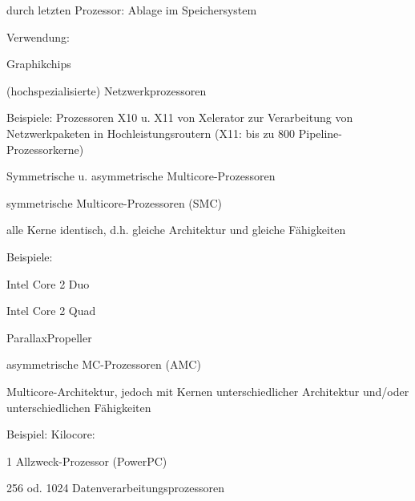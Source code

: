 \documentclass[a4paper]{article}
\begin{document}
\begin{multicols}{3}
\begin{itemize*}
\begin{itemize*}
            \item durch letzten Prozessor: Ablage im Speichersystem
            \item Verwendung: \begin{itemize*} \item   Graphikchips \item   (hochspezialisierte) Netzwerkprozessoren \end{itemize*}
            \item Beispiele: Prozessoren X10 u. X11 von Xelerator zur Verarbeitung von Netzwerkpaketen in Hochleistungsroutern (X11: bis zu 800 Pipeline-Prozessorkerne)
        \end{itemize*}
    \end{itemize*}

    Symmetrische u. asymmetrische Multicore-Prozessoren

    \begin{itemize*}
        \item
        symmetrische Multicore-Prozessoren (SMC)
        \begin{itemize*}
            \item alle Kerne identisch, d.h. gleiche Architektur und gleiche Fähigkeiten
            \item Beispiele: \begin{itemize*} \item   Intel Core 2 Duo \item   Intel Core 2 Quad \item   ParallaxPropeller \end{itemize*}
        \end{itemize*}
        \item
        asymmetrische MC-Prozessoren (AMC)
        \item
        Multicore-Architektur, jedoch mit Kernen unterschiedlicher Architektur
        und/oder unterschiedlichen Fähigkeiten
        \item
        Beispiel: Kilocore:
        \begin{itemize*}
            \item 1 Allzweck-Prozessor (PowerPC)
            \item \begin{itemize*} \item   256 od. 1024 Datenverarbeitungsprozessoren \end{itemize*}
        \end{itemize*}
    \end{itemize*}



\end{multicols}
\end{document}

